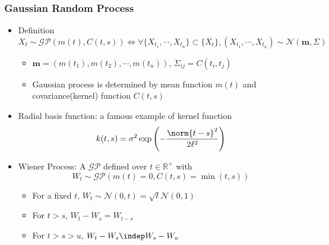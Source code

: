 \subsubsection*{Gaussian Random Process}
\begin{itemize}
    \item Definition
    \begin{equation}
        X_t\sim\mathcal{GP}(m(t),C(t,s))\iff\forall\{X_{t_1},\cdots,X_{t_n}\}\subset\{X_t\},(X_{t_1},\cdots,X_{t_n})\sim\mathcal{N}(\mathbf{m},\Sigma)
    \end{equation}
    \begin{itemize}
        \item $\mathbf{m}=\left(m(t_1),m(t_2),\cdots,m(t_n)\right)$, $\Sigma_{ij}=C(t_i,t_j)$
        \item Gaussian process is determined by mean function $m(t)$ and covariance(kernel) function $C(t,s)$
    \end{itemize}
    \item Radial basis function: a famous example of kernel function
    \begin{equation}
        k(t,s)=\sigma^2\exp\left(-\frac{\norm{t-s}^2}{2\ell^2}\right)
    \end{equation}
    \item Wiener Process: A $\mathcal{GP}$ defined over $t\in\mathbb{R}^+$ with
    \begin{equation}
        W_t\sim\mathcal{GP}(m(t)=0,C(t,s)=\min(t,s))
    \end{equation}
    \begin{itemize}
        \item For a fixed $t$, $W_t\sim\mathcal{N}(0,t)=\sqrt{t}\mathcal{N}(0,1)$
        \item For $t>s$, $W_t-W_s=W_{t-s}$
        \item For $t>s>u$, $W_t-W_s\indep W_s-W_u$
    \end{itemize}
\end{itemize}

